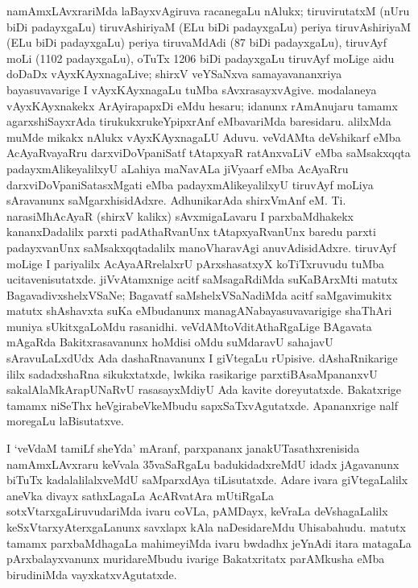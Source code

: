 namAmxLAvxrariMda laBayxvAgiruva racanegaLu nAlukx; tiruvirutatxM (nUru biDi padayxgaLu) tiruvAshiriyaM (ELu biDi padayxgaLu) periya tiruvAshiriyaM (ELu biDi padayxgaLu) periya tiruvaMdAdi ({\rm 87} biDi padayxgaLu), tiruvAyf moLi ({\rm 1102} padayxgaLu), oTuTx {\rm 1206} biDi padayxgaLu tiruvAyf moLige aidu doDaDx vAyxKAyxnagaLive; shirxV veYSaNxva samayavananxriya bayasuvavarige I vAyxKAyxnagaLu tuMba sAvxrasayxvAgive. modalaneya vAyxKAyxnakekx ArAyirapapxDi eMdu hesaru; idanunx rAmAnujaru tamamx agarxshiSayxrAda tirukukxrukeYpipxrAnf eMbavariMda baresidaru. alilxMda muMde mikakx nAlukx vAyxKAyxnagaLU Aduvu. veVdAMta deVshikarf eMba AcAyaRvayaRru darxviDoVpaniSatf tAtapxyaR ratAnxvaLiV eMba saMsakxqqta padayxmAlikeyalilxyU aLahiya maNavALa jiVyaarf eMba AcAyaRru darxviDoVpaniSatasxMgati eMba padayxmAlikeyalilxyU tiruvAyf moLiya sAravanunx saMgarxhisidAdxre. AdhunikarAda shirxVmAnf eM. Ti. narasiMhAcAyaR (shirxV kalikx) sAvxmigaLavaru I parxbaMdhakekx kananxDadalilx parxti padAthaRvanUnx tAtapxyaRvanUnx baredu parxti padayxvanUnx saMsakxqqtadalilx manoVharavAgi anuvAdisidAdxre. tiruvAyf moLige I pariyalilx AcAyaARrelalxrU pArxshasatxyX koTiTxruvudu tuMba ucitavenisutatxde. jiVvAtamxnige acitf saMsagaRdiMda suKaBArxMti matutx BagavadivxshelxVSaNe; Bagavatf saMshelxVSaNadiMda acitf saMgavimukitx matutx shAshavxta suKa eMbudanunx managANabayasuvavarigige shaThAri muniya sUkitxgaLoMdu rasanidhi. veVdAMtoVditAthaRgaLige BAgavata mAgaRda Bakitxrasavanunx hoMdisi oMdu suMdaravU sahajavU sAravuLaLxdUdx Ada dashaRnavanunx I giVtegaLu rUpisive. dAshaRnikarige ililx sadadxshaRna sikukxtatxde, lwkika rasikarige parxtiBAsaMpananxvU sakalAlaMkArapUNaRvU rasasayxMdiyU Ada kavite doreyutatxde. Bakatxrige tamamx niSeThx heVgirabeVkeMbudu sapxSaTxvAgutatxde. Apananxrige nalf moregaLu laBisutatxve.

I `veVdaM tamiLf sheYda' mAranf, parxpananx janakUTasathxrenisida namAmxLAvxraru keVvala {\rm 35}vaSaRgaLu badukidadxreMdU idadx jAgavanunx biTuTx kadalalilalxveMdU saMparxdAya
tiLisutatxde. Adare ivara giVtegaLalilx aneVka divayx sathxLagaLa AcARvatAra mUtiRgaLa sotxVtarxgaLiruvudariMda ivaru coVLa, pAMDayx, keVraLa deVshagaLalilx keSxVtarxyAterxgaLanunx savxlapx kAla naDesidareMdu Uhisabahudu. matutx tamamx parxbaMdhagaLa mahimeyiMda ivaru bwdadhx jeYnAdi itara matagaLa pArxbalayxvanunx muridareMbudu ivarige Bakatxritatx parAMkusha eMba birudiniMda vayxkatxvAgutatxde.

